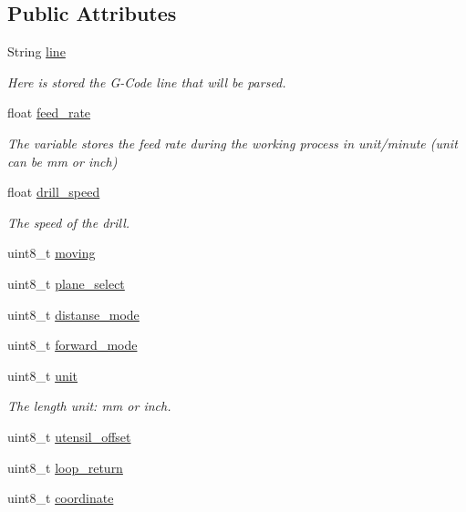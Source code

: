 \subsection*{Public Attributes}
\begin{DoxyCompactItemize}
\item 
String \hyperlink{class_g_code_a20d7c90740e9e139b24f68336ad8c8f1}{line}
\begin{DoxyCompactList}\small\item\em Here is stored the G-\/\+Code line that will be parsed. \end{DoxyCompactList}\item 
float \hyperlink{class_g_code_a0115efce11fdffa2c59304706ecacede}{feed\+\_\+rate}
\begin{DoxyCompactList}\small\item\em The variable stores the feed rate during the working process in unit/minute (unit can be mm or inch) \end{DoxyCompactList}\item 
float \hyperlink{class_g_code_a2fc16db9dc5dbe95abc8b9b2a5ab6f5c}{drill\+\_\+speed}
\begin{DoxyCompactList}\small\item\em The speed of the drill. \end{DoxyCompactList}\item 
uint8\+\_\+t \hyperlink{class_g_code_ae84ec0e15b18d91420c39627d1bdf78a}{moving}
\item 
uint8\+\_\+t \hyperlink{class_g_code_a0f278ed4c1265656f062365ca345d353}{plane\+\_\+select}
\item 
uint8\+\_\+t \hyperlink{class_g_code_a77dad1d8057ecc38242757923a2bb87f}{distanse\+\_\+mode}
\item 
uint8\+\_\+t \hyperlink{class_g_code_acbf5f3b9aeffe27d3f87e9d57b487146}{forward\+\_\+mode}
\item 
uint8\+\_\+t \hyperlink{class_g_code_a76a406426d6a80e3c08b0ecd09db3ffd}{unit}
\begin{DoxyCompactList}\small\item\em The length unit\+: mm or inch. \end{DoxyCompactList}\item 
uint8\+\_\+t \hyperlink{class_g_code_a33ac8c517b978b71a6af37c362dc3edb}{utensil\+\_\+offset}
\item 
uint8\+\_\+t \hyperlink{class_g_code_a600deaa28b54bd8fca4d8eb51fb09b55}{loop\+\_\+return}
\item 
uint8\+\_\+t \hyperlink{class_g_code_a4311a77cb2efcc0bce0c582ae80755e1}{coordinate}

\end{DoxyCompactItemize}
